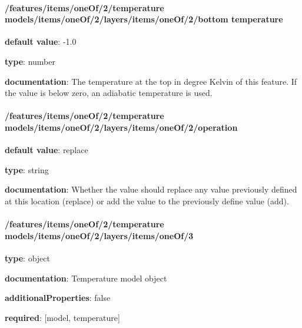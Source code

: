 \begin{itemized}
\end{itemized}\paragraph{/features/items/oneOf/2/temperature models/items/oneOf/2/layers/items/oneOf/2/bottom temperature} \begin{itemized}
\item {\bf default value}: -1.0
\item {\bf type}: number
\item {\bf documentation}: The temperature at the top in degree Kelvin of this feature. If the value is below zero, an adiabatic temperature is used.
\end{itemized}\paragraph{/features/items/oneOf/2/temperature models/items/oneOf/2/layers/items/oneOf/2/operation} \begin{itemized}
\item {\bf default value}: replace
\item {\bf type}: string
\item {\bf documentation}: Whether the value should replace any value previously defined at this location (replace) or add the value to the previously define value (add).
\end{itemized}\paragraph{/features/items/oneOf/2/temperature models/items/oneOf/2/layers/items/oneOf/3} \begin{itemized}
\item {\bf type}: object
\item {\bf documentation}: Temperature model object
\item {\bf additionalProperties}: false
\item {\bf required}: [model, temperature]\end{itemized}
